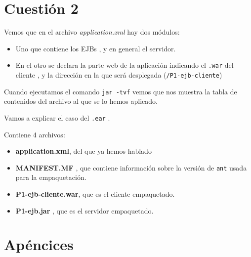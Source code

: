 \documentclass[a4paper, 10pt]{article}
\begin{document}
\section{Cuestión 2}
Vemos que en el archivo \textit{application.xml} hay dos módulos:
\begin{itemize}
	\item Uno que contiene los EJBs , y en general el servidor.
	\item En el otro se declara la parte web de la aplicación indicando el \texttt{.war} del cliente , y la dirección en la que será desplegada (\texttt{/P1-ejb-cliente})
 \end{itemize}
 
 Cuando ejecutamos el comando \texttt{jar -tvf} vemos que nos muestra la tabla de contenidos del archivo al que se lo hemos aplicado.
 
 Vamos a explicar el caso del \texttt{.ear} .
 
 Contiene 4 archivos:
 \begin{itemize}
 	\item \textbf{application.xml}, del que ya hemos hablado
 	\item \textbf{MANIFEST.MF} , que contiene información sobre la versión de \texttt{ant} usada para la empaquetación.
 	\item \textbf{P1-ejb-cliente.war}, que es el cliente empaquetado.
 	\item \textbf{P1-ejb.jar} , que es el servidor empaquetado.
 \end{itemize} 
\newpage
\appendix
\section{Apéncices}
\end{document}
